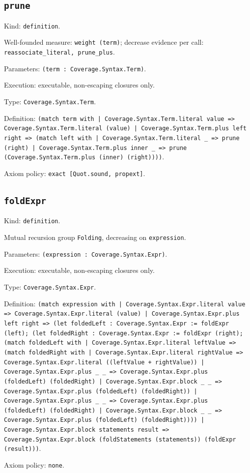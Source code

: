 \documentclass[11pt]{article}
\begin{document}
\subsection*{\texttt{prune}}
\noindent Kind: \texttt{definition}.\par
\noindent Well-founded measure: \texttt{weight (term)}; decrease evidence per call: \texttt{reassociate\_literal, prune\_plus}.\par
\noindent Parameters: \texttt{(term : Coverage.Syntax.Term)}.\par
\noindent Execution: executable, non-escaping closures only.\par
\noindent Type: \texttt{Coverage.Syntax.Term}.\par
\noindent Definition: \texttt{(match term with | Coverage.Syntax.Term.literal value => Coverage.Syntax.Term.literal (value) | Coverage.Syntax.Term.plus left right => (match left with | Coverage.Syntax.Term.literal \_ => prune (right) | Coverage.Syntax.Term.plus inner \_ => prune (Coverage.Syntax.Term.plus (inner) (right))))}.\par
\noindent Axiom policy: \texttt{exact [Quot.sound, propext]}.\par
\subsection*{\texttt{foldExpr}}
\noindent Kind: \texttt{definition}.\par
\noindent Mutual recursion group \texttt{Folding}, decreasing on \texttt{expression}.\par
\noindent Parameters: \texttt{(expression : Coverage.Syntax.Expr)}.\par
\noindent Execution: executable, non-escaping closures only.\par
\noindent Type: \texttt{Coverage.Syntax.Expr}.\par
\noindent Definition: \texttt{(match expression with | Coverage.Syntax.Expr.literal value => Coverage.Syntax.Expr.literal (value) | Coverage.Syntax.Expr.plus left right => (let foldedLeft : Coverage.Syntax.Expr := foldExpr (left); (let foldedRight : Coverage.Syntax.Expr := foldExpr (right); (match foldedLeft with | Coverage.Syntax.Expr.literal leftValue => (match foldedRight with | Coverage.Syntax.Expr.literal rightValue => Coverage.Syntax.Expr.literal ((leftValue + rightValue)) | Coverage.Syntax.Expr.plus \_ \_ => Coverage.Syntax.Expr.plus (foldedLeft) (foldedRight) | Coverage.Syntax.Expr.block \_ \_ => Coverage.Syntax.Expr.plus (foldedLeft) (foldedRight)) | Coverage.Syntax.Expr.plus \_ \_ => Coverage.Syntax.Expr.plus (foldedLeft) (foldedRight) | Coverage.Syntax.Expr.block \_ \_ => Coverage.Syntax.Expr.plus (foldedLeft) (foldedRight)))) | Coverage.Syntax.Expr.block statements result => Coverage.Syntax.Expr.block (foldStatements (statements)) (foldExpr (result)))}.\par
\noindent Axiom policy: \texttt{none}.\par
\end{document}
